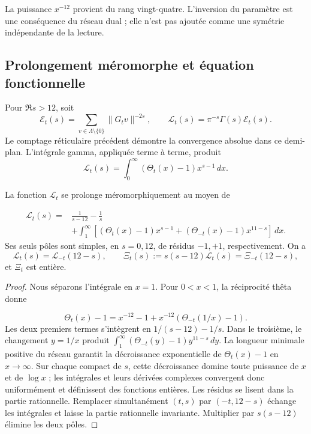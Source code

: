 La puissance \(x^{-12}\) provient du rang vingt-quatre. L’inversion du paramètre est une conséquence du réseau dual ; elle n’est pas ajoutée comme une symétrie indépendante de la lecture.

\subsection{Prolongement méromorphe et équation fonctionnelle
}

Pour \(\Re s>12\), soit
\begin{equation}
 \mathcal E_t(s)=\sum_{v\in\Lambda\setminus\{0\}}\|G_tv\|^{-2s},
 \qquad \mathcal L_t(s)=\pi^{-s}\Gamma(s)\mathcal E_t(s).
 \label{rec:eq:epstein}
\end{equation}
Le comptage réticulaire précédent démontre la convergence absolue dans ce demi-plan. L'intégrale gamma, appliquée terme à terme, produit
\[
 \mathcal L_t(s)=\int_0^\infty(\Theta_t(x)-1)x^{s-1}\,dx.
\]

\begin{theorem}
\label{rec:thm:mellin}
La fonction \(\mathcal L_t\) se prolonge méromorphiquement au moyen de

\begin{align}
 \mathcal L_t(s)={}&\frac1{s-12}-\frac1s\nonumber\\
 &+\int_1^\infty\left[(\Theta_t(x)-1)x^{s-1}
                 +(\Theta_{-t}(x)-1)x^{11-s}\right]\,dx.
 \label{rec:eq:mellin-partida}
\end{align}
Ses seuls pôles sont simples, en \(s=0,12\), de résidus \(-1,+1\), respectivement. On a
\begin{equation}
 \mathcal L_t(s)=\mathcal L_{-t}(12-s),\qquad
 \Xi_t(s):=s(s-12)\mathcal L_t(s)=\Xi_{-t}(12-s),
 \label{rec:eq:funcional}
\end{equation}
et \(\Xi_t\) est entière.

\end{theorem}
\begin{proof}
Nous séparons l’intégrale en \(x=1\). Pour \(0<x<1\), la réciprocité thêta donne

\[
 \Theta_t(x)-1=x^{-12}-1+x^{-12}(\Theta_{-t}(1/x)-1).
\]
Les deux premiers termes s'intègrent en \(1/(s-12)-1/s\). Dans le troisième, le changement \(y=1/x\) produit \(\int_1^\infty(\Theta_{-t}(y)-1)y^{11-s}\,dy\). La longueur minimale positive du réseau garantit la décroissance exponentielle de \(\Theta_t(x)-1\) en \(x\to\infty\). Sur chaque compact de \(s\), cette décroissance domine toute puissance de \(x\) et de \(\log x\) ; les intégrales et leurs dérivées complexes convergent donc uniformément et définissent des fonctions entières. Les résidus se lisent dans la partie rationnelle. Remplacer simultanément \((t,s)\) par \((-t,12-s)\) échange les intégrales et laisse la partie rationnelle invariante. Multiplier par \(s(s-12)\) élimine les deux pôles.
\end{proof}

